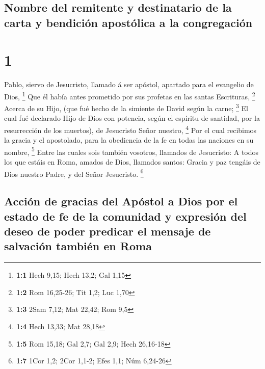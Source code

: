 \hypertarget{nombre-del-remitente-y-destinatario-de-la-carta-y-bendiciuxf3n-apostuxf3lica-a-la-congregaciuxf3n}{%
\subsection{Nombre del remitente y destinatario de la carta y bendición
apostólica a la
congregación}\label{nombre-del-remitente-y-destinatario-de-la-carta-y-bendiciuxf3n-apostuxf3lica-a-la-congregaciuxf3n}}

\hypertarget{section}{%
\section{1}\label{section}}

 Pablo, siervo de Jesucristo, llamado á ser apóstol,
apartado para el evangelio de Dios, \footnote{\textbf{1:1} Hech 9,15;
  Hech 13,2; Gal 1,15}  Que él había antes prometido por sus
profetas en las santas Escrituras, \footnote{\textbf{1:2} Rom 16,25-26;
  Tit 1,2; Luc 1,70}  Acerca de su Hijo, (que fué hecho de
la simiente de David según la carne; \footnote{\textbf{1:3} 2Sam 7,12;
  Mat 22,42; Rom 9,5}  El cual fué declarado Hijo de Dios
con potencia, según el espíritu de santidad, por la resurrección de los
muertos), de Jesucristo Señor nuestro, \footnote{\textbf{1:4} Hech
  13,33; Mat 28,18}  Por el cual recibimos la gracia y el
apostolado, para la obediencia de la fe en todas las naciones en su
nombre, \footnote{\textbf{1:5} Rom 15,18; Gal 2,7; Gal 2,9; Hech
  26,16-18}  Entre las cuales sois también vosotros,
llamados de Jesucristo:  A todos los que estáis en Roma,
amados de Dios, llamados santos: Gracia y paz tengáis de Dios nuestro
Padre, y del Señor Jesucristo. \footnote{\textbf{1:7} 1Cor 1,2; 2Cor
  1,1-2; Efes 1,1; Núm 6,24-26}

\hypertarget{acciuxf3n-de-gracias-del-apuxf3stol-a-dios-por-el-estado-de-fe-de-la-comunidad-y-expresiuxf3n-del-deseo-de-poder-predicar-el-mensaje-de-salvaciuxf3n-tambiuxe9n-en-roma}{%
\subsection{Acción de gracias del Apóstol a Dios por el estado de fe de
la comunidad y expresión del deseo de poder predicar el mensaje de
salvación también en
Roma}\label{acciuxf3n-de-gracias-del-apuxf3stol-a-dios-por-el-estado-de-fe-de-la-comunidad-y-expresiuxf3n-del-deseo-de-poder-predicar-el-mensaje-de-salvaciuxf3n-tambiuxe9n-en-roma}}

